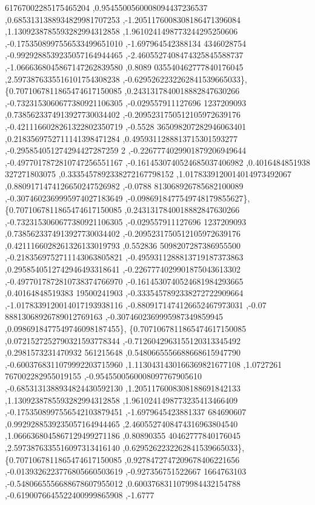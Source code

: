 \begin{DoxyCode}
      61767002285175465204 ,0.9545500560008094437236537 ,0.6853131388934829981707253 ,-1.2051176008308186471396084
       ,1.1309238785593282994312858 ,1.9610241498773244295250606 ,-0.1753508997556533499651010 ,-1.697964542388134
      4346028754 ,-0.9929288539235057164944465 ,-2.4605527408474325845588737 ,-1.0666368045867147262839580 ,0.8089
      035540462777840176045 ,2.5973876335516101754308238 ,-0.6295262232262841539665033\},
\{0.7071067811865474617150085 ,0.2431317840018882847630266 ,-0.7323153060677380921106305 ,-0.029557911127696
      1237209093 ,0.7385623374913927730034402 ,-0.2095231750512105972639176 ,-0.4211166028261322802350719 ,-0.5528
      365098207282946063401 ,0.2183569752711141398471284 ,0.4959311288813715301593277 ,-0.295854051274294427287259
      2 ,-0.2267774029901879206949644 ,-0.4977017872810747256551167 ,-0.1614530740524685037406982 ,0.4016484851938
      327271803075 ,0.3335457892338272167798152 ,1.0178339120014014973492067 ,0.8809171474126650247526982 ,-0.0788
      813068926785682100089 ,-0.3074602369995974027183649 ,-0.0986918477549748179855627\},
\{0.7071067811865474617150085 ,0.2431317840018882847630266 ,-0.7323153060677380921106305 ,-0.029557911127696
      1237209093 ,0.7385623374913927730034402 ,-0.2095231750512105972639176 ,0.4211166028261326133019793 ,0.552836
      5098207287386955500 ,-0.2183569752711143063805821 ,-0.4959311288813719187373863 ,0.2958540512742946493318641
       ,-0.2267774029901875043613302 ,-0.4977017872810738374766970 ,-0.1614530740524681984293665 ,0.40164848519383
      19500241903 ,-0.3335457892338272722909664 ,-1.0178339120014017193938116 ,-0.8809171474126652467973031 ,-0.07
      88813068926789012769163 ,-0.3074602369995987349859945 ,0.0986918477549746098187455\},
\{0.7071067811865474617150085 ,0.0721527252790321593778344 ,-0.7126042963155120313345492 ,0.2981573231470932
      561215648 ,0.5480665556688668615947790 ,-0.6003768311079992203715960 ,1.1130431430166369821677108 ,1.0727261
      767002282955019155 ,-0.9545500560008097767905610 ,-0.6853131388934824430592130 ,1.2051176008308188691842133 
      ,1.1309238785593282994312858 ,1.9610241498773235413466409 ,-0.1753508997556542103879451 ,-1.6979645423881337
      684690607 ,0.9929288539235057164944465 ,2.4605527408474316963804540 ,1.0666368045867129499271186 ,0.80890355
      40462777840176045 ,2.5973876335516097313416140 ,0.6295262232262841539665033\},
\{0.7071067811865474617150085 ,0.9278472747209678406221656 ,-0.0139326223776805660503619 ,-0.927356751522667
      1664763103 ,-0.5480665556688678607955012 ,0.6003768311079984432154788 ,-0.6190076645522400999865908 ,-1.6777

\end{DoxyCode}

